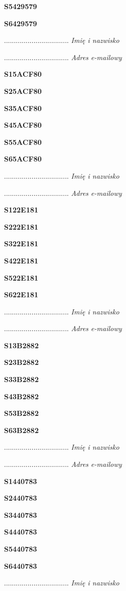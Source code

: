 \Large \textbf{S5429579}

\Large \textbf{S6429579}

.................................
\textit{Imię i nazwisko}

.................................
\textit{Adres e-mailowy}

\Large \textbf{S15ACF80}

\Large \textbf{S25ACF80}

\Large \textbf{S35ACF80}

\Large \textbf{S45ACF80}

\Large \textbf{S55ACF80}

\Large \textbf{S65ACF80}

.................................
\textit{Imię i nazwisko}

.................................
\textit{Adres e-mailowy}

\Large \textbf{S122E181}

\Large \textbf{S222E181}

\Large \textbf{S322E181}

\Large \textbf{S422E181}

\Large \textbf{S522E181}

\Large \textbf{S622E181}

.................................
\textit{Imię i nazwisko}

.................................
\textit{Adres e-mailowy}

\Large \textbf{S13B2882}

\Large \textbf{S23B2882}

\Large \textbf{S33B2882}

\Large \textbf{S43B2882}

\Large \textbf{S53B2882}

\Large \textbf{S63B2882}

.................................
\textit{Imię i nazwisko}

.................................
\textit{Adres e-mailowy}

\Large \textbf{S1440783}

\Large \textbf{S2440783}

\Large \textbf{S3440783}

\Large \textbf{S4440783}

\Large \textbf{S5440783}

\Large \textbf{S6440783}

.................................
\textit{Imię i nazwisko}

